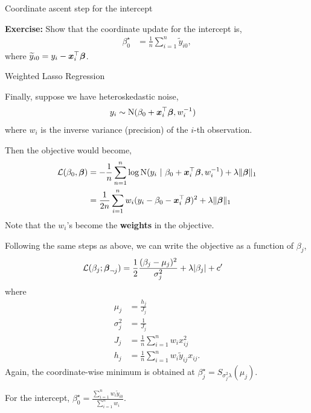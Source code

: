 \documentclass[aspectratio=169]{beamer}
\begin{document}
\begin{frame}[t,allowframebreaks]{Coordinate ascent step for the
intercept}\label{coordinate-ascent-step-for-the-intercept}

\textbf{Exercise:} Show that the coordinate update
for the intercept is, 
\begin{align*}
\beta_0^\star &= \frac{1}{n} \sum_{i=1}^n \widetilde{y}_{i0},
\end{align*} 
where \(\widetilde{y}_{i0} = y_i - \boldsymbol{x}_i^\top \boldsymbol{\beta}\).

\end{frame}

\begin{frame}[t,allowframebreaks]{Weighted Lasso
Regression}\label{weighted-lasso-regression}

Finally, suppose we have heteroskedastic noise, \begin{align*}
y_i &\sim \mathrm{N}(\beta_0 + \boldsymbol{x}_i^\top \boldsymbol{\beta}, w_i^{-1})
\end{align*} where \(w_i\) is the inverse variance (precision) of the
\(i\)-th observation.

Then the objective would become, \begin{align*}
\mathcal{L}(\beta_0, \boldsymbol{\beta}) 
&= -\frac{1}{n} \sum_{n=1}^n \log \mathrm{N}(y_i ~\vert~ \beta_0 + \boldsymbol{x}_i^\top \boldsymbol{\beta}, w_i^{-1}) + \lambda \|\boldsymbol{\beta}\|_1 \\
&= \frac{1}{2n} \sum_{i=1}^n w_i (y_i - \beta_0 - \boldsymbol{x}_i^\top \boldsymbol{\beta})^2 + \lambda \|\boldsymbol{\beta}\|_1
\end{align*} Note that the \(w_i\)'s become the \textbf{weights} in the
objective.

Following the same steps as above, we can write the objective as a
function of \(\beta_j\), \begin{align*}
\mathcal{L}(\beta_j; \boldsymbol{\beta}_{\neg j}) 
&= \frac{1}{2} \frac{(\beta_j - \mu_j)^2}{\sigma_j^2} + \lambda |\beta_j| + c'
\end{align*} where \begin{align*}
\mu_j &= \frac{h_j}{J_j} \\
\sigma_j^2 &= \frac{1}{J_j} \\
J_j &= \frac{1}{n} \sum_{i=1}^n w_i x_{ij}^2 \\
h_j &= \frac{1}{n} \sum_{i=1}^n w_i \widetilde{y}_{ij} x_{ij}.
\end{align*} Again, the coordinate-wise minimum is obtained at
\(\beta_j^\star = S_{\sigma_j^2 \lambda}(\mu_j)\).

For the intercept,
\(\beta_0^\star = \frac{\sum_{i=1}^n w_i \widetilde{y}_{i0}}{\sum_{i=1}^n w_i}\).
\end{frame}
\end{document}
